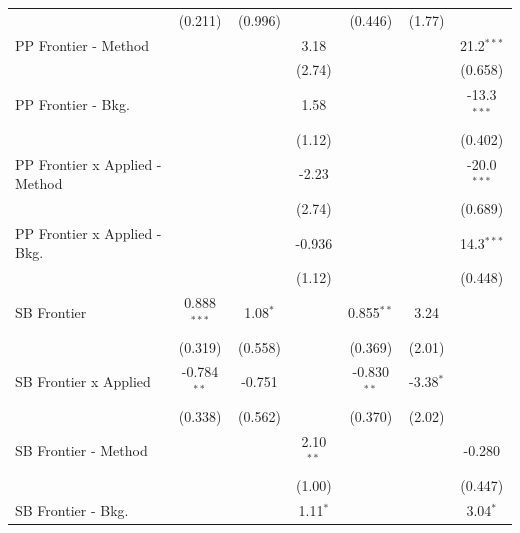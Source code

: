 \begin{tabular}{lcccccc}
                                  & (0.211)       & (0.996)       &               & (0.446)       & (1.77)        &   \\   
   PP Frontier - Method           &               &               & 3.18          &               &               & 21.2$^{***}$\\   
                                  &               &               & (2.74)        &               &               & (0.658)\\   
   PP Frontier - Bkg.             &               &               & 1.58          &               &               & -13.3$^{***}$\\   
                                  &               &               & (1.12)        &               &               & (0.402)\\   
   PP Frontier x Applied - Method &               &               & -2.23         &               &               & -20.0$^{***}$\\   
                                  &               &               & (2.74)        &               &               & (0.689)\\   
   PP Frontier x Applied - Bkg.   &               &               & -0.936        &               &               & 14.3$^{***}$\\   
                                  &               &               & (1.12)        &               &               & (0.448)\\   
   SB Frontier                    & 0.888$^{***}$ & 1.08$^{*}$    &               & 0.855$^{**}$  & 3.24          &   \\   
                                  & (0.319)       & (0.558)       &               & (0.369)       & (2.01)        &   \\   
   SB Frontier x Applied          & -0.784$^{**}$ & -0.751        &               & -0.830$^{**}$ & -3.38$^{*}$   &   \\   
                                  & (0.338)       & (0.562)       &               & (0.370)       & (2.02)        &   \\   
   SB Frontier - Method           &               &               & 2.10$^{**}$   &               &               & -0.280\\   
                                  &               &               & (1.00)        &               &               & (0.447)\\   
   SB Frontier - Bkg.             &               &               & 1.11$^{*}$    &               &               & 3.04$^{*}$\\   

\end{tabular}
